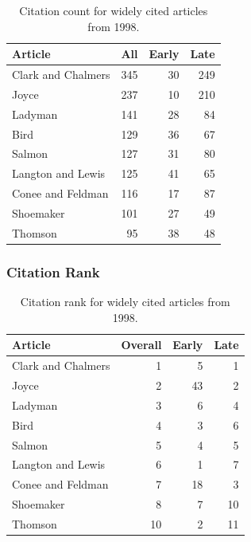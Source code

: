 \documentclass[
  10pt,
  letterpaper,
  DIV=11,
  numbers=noendperiod,
  twoside]{scrartcl}
\begin{document}
\begin{longtable}[]{@{}lrrr@{}}

\caption{\label{tbl-citation-count-1998}Citation count for widely cited
articles from 1998.}

\tabularnewline

\toprule\noalign{}
Article & All & Early & Late \\
\midrule\noalign{}
\endhead
\bottomrule\noalign{}
\endlastfoot
Clark and Chalmers & 345 & 30 & 249 \\
Joyce & 237 & 10 & 210 \\
Ladyman & 141 & 28 & 84 \\
Bird & 129 & 36 & 67 \\
Salmon & 127 & 31 & 80 \\
Langton and Lewis & 125 & 41 & 65 \\
Conee and Feldman & 116 & 17 & 87 \\
Shoemaker & 101 & 27 & 49 \\
Thomson & 95 & 38 & 48 \\

\end{longtable}

\subsubsection*{Citation Rank}\label{sec-rank-1998}

\begin{longtable}[]{@{}lrrr@{}}

\caption{\label{tbl-citation-rank-1998}Citation rank for widely cited
articles from 1998.}

\tabularnewline

\toprule\noalign{}
Article & Overall & Early & Late \\
\midrule\noalign{}
\endhead
\bottomrule\noalign{}
\endlastfoot
Clark and Chalmers & 1 & 5 & 1 \\
Joyce & 2 & 43 & 2 \\
Ladyman & 3 & 6 & 4 \\
Bird & 4 & 3 & 6 \\
Salmon & 5 & 4 & 5 \\
Langton and Lewis & 6 & 1 & 7 \\
Conee and Feldman & 7 & 18 & 3 \\
Shoemaker & 8 & 7 & 10 \\
Thomson & 10 & 2 & 11 \\

\end{longtable}
\end{document}
